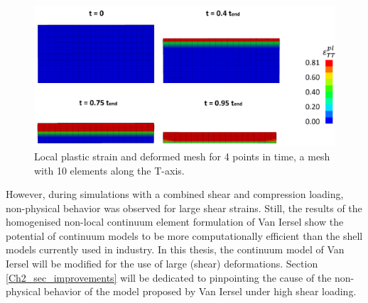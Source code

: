 \begin{figure}[H]
    \centering
    \includegraphics[width=0.75\linewidth]{./Images/Ch2/Ch2_dap_deformedblock.PNG}
    \caption{Local plastic strain and deformed mesh for 4 points in time, a mesh with 10 elements along the T-axis. \cite{DAP}}
    \label{Ch2_dap_deformedblock}
\end{figure}
However, during simulations with a combined shear and compression loading, non-physical behavior was observed for large shear strains. Still, the results of the homogenised non-local continuum element formulation of Van Iersel show the potential of continuum models to be more computationally efficient than the shell models currently used in industry. In this thesis, the continuum model of Van Iersel will be modified for the use of large (shear) deformations. Section \ref{Ch2_sec_improvements} will be dedicated to pinpointing the cause of the non-physical behavior of the model proposed by Van Iersel under high shear loading. 

